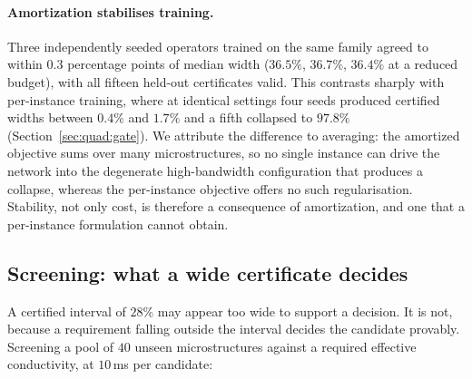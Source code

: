 \paragraph{Amortization stabilises training.} Three independently seeded
operators trained on the same family agreed to within $0.3$ percentage
points of median width ($36.5\%$, $36.7\%$, $36.4\%$ at a reduced budget),
with all fifteen held-out certificates valid. This contrasts sharply with
per-instance training, where at identical settings four seeds produced
certified widths between $0.4\%$ and $1.7\%$ and a fifth collapsed to
$97.8\%$ (Section~\ref{sec:quad:gate}). We attribute the difference to
averaging: the amortized objective sums over many microstructures, so no
single instance can drive the network into the degenerate high-bandwidth
configuration that produces a collapse, whereas the per-instance objective
offers no such regularisation. Stability, not only cost, is therefore a
consequence of amortization, and one that a per-instance formulation
cannot obtain.

\subsection{Screening: what a wide certificate decides}
\label{sec:amortized:screening}

A certified interval of $28\%$ may appear too wide to support a decision.
It is not, because a requirement falling outside the interval decides the
candidate provably. Screening a pool of $40$ unseen microstructures against
a required effective conductivity, at $10$\,ms per candidate:

\begin{table}[t]
\centering
\caption{Provable screening decisions from amortized certificates. PASS
means the certified lower bound already meets the requirement; FAIL that
the upper bound cannot. The last column counts decisions contradicted by an
independent finite-volume reference.}
\label{tab:screening}

\end{table}


